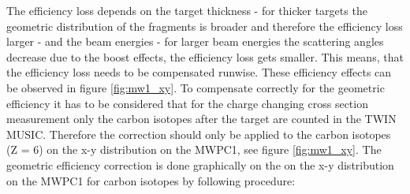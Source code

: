 The efficiency loss depends on the target thickness - for thicker targets the geometric distribution of the fragments is broader and therefore the efficiency loss larger - and the beam energies - for larger beam energies the scattering angles decrease due to the boost effects, the efficiency loss gets smaller. This means, that the efficiency loss needs to be compensated runwise. These efficiency effects can be observed in figure \ref{fig:mw1_xy}.\newline
To compensate correctly for the geometric efficiency it has to be considered that for the charge changing cross section measurement only the carbon isotopes after the target are counted in the TWIN MUSIC. Therefore the correction should only be applied to the carbon isotopes (Z = 6) on the x-y distribution on the MWPC1, see figure \ref{fig:mw1_xy}. The geometric efficiency correction is done graphically on the on the x-y distribution on the MWPC1 for carbon isotopes by following procedure:



